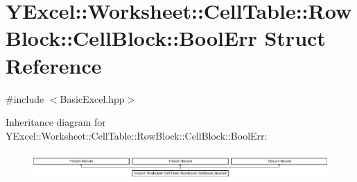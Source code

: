 \hypertarget{struct_y_excel_1_1_worksheet_1_1_cell_table_1_1_row_block_1_1_cell_block_1_1_bool_err}{}\section{Y\+Excel\+:\+:Worksheet\+:\+:Cell\+Table\+:\+:Row\+Block\+:\+:Cell\+Block\+:\+:Bool\+Err Struct Reference}
\label{struct_y_excel_1_1_worksheet_1_1_cell_table_1_1_row_block_1_1_cell_block_1_1_bool_err}


{\ttfamily \#include $<$Basic\+Excel.\+hpp$>$}

Inheritance diagram for Y\+Excel\+:\+:Worksheet\+:\+:Cell\+Table\+:\+:Row\+Block\+:\+:Cell\+Block\+:\+:Bool\+Err\+:\begin{figure}[H]
\begin{center}
\leavevmode
\includegraphics[height=1.057601cm]{struct_y_excel_1_1_worksheet_1_1_cell_table_1_1_row_block_1_1_cell_block_1_1_bool_err}
\end{center}
\end{figure}
